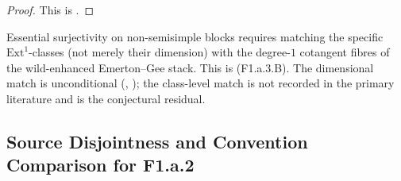 \begin{proof}
This is .
\end{proof}

\begin{remark}
\label{v4-arith:w5-e:rem:f1a2-cond}
Essential surjectivity on non-semisimple blocks requires matching the
specific \(\mathrm{Ext}^{1}\)-classes (not merely their dimension) with
the degree-\(1\) cotangent fibres of the wild-enhanced Emerton--Gee
stack. This is 
(F1.a.3.B). The dimensional match is unconditional
(,
); the class-level match is
not recorded in the primary literature and is the conjectural
residual.
\end{remark}

\subsection{Source Disjointness and Convention Comparison for F1.a.2}

